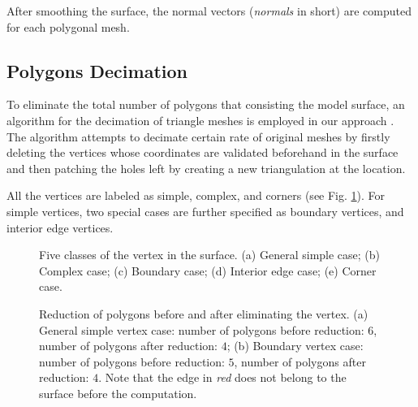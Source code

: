After smoothing the surface, the normal vectors (\emph{normals} in short) are computed for each polygonal mesh.

\subsection{Polygons Decimation}
\label{subsec:decimation}

To eliminate the total number of polygons that consisting the model surface, an algorithm for the decimation of triangle meshes is employed in our approach \cite{Schroeder1992}.
The algorithm attempts to decimate certain rate of original meshes by firstly deleting the vertices whose coordinates are validated beforehand in the surface and then patching the holes left by creating a new triangulation at the location. %

All the vertices are labeled as simple, complex, and corners (see Fig. \ref{fig:FiveClasses}).
For simple vertices, two special cases are further specified as boundary vertices, and interior edge vertices.
\begin{figure}[t]
\centering
\subfloat[]{

\label{fig:GeneralSimple}
}
\hfil
\subfloat[]{

\label{fig:Complex}
}
\hfil
\subfloat[]{

\label{fig:Boundary}
}
\hfil
\subfloat[]{

\label{fig:InteriorEdge}
}
\hfil
\subfloat[]{

\label{fig:Corner}
}
\caption{Five classes of the vertex in the surface. (a) General simple case; (b) Complex case; (c) Boundary case; (d) Interior edge case; (e) Corner case. }%
\label{fig:FiveClasses}
\end{figure}
\begin{figure}[t]
\centering
\subfloat[]{

\label{fig:SimpleReduction}
}
\hfil
\subfloat[]{

\label{fig:BoundaryReduction}
}
\caption{Reduction of polygons before and after eliminating the vertex. (a) General simple vertex case: number of polygons before reduction: $6$, number of polygons after reduction: $4$; (b) Boundary vertex case: number of polygons before reduction: $5$, number of polygons after reduction: $4$. Note that the edge in \emph{red} does not belong to the surface before the computation. }%
\label{fig:Reduction}
\end{figure}

